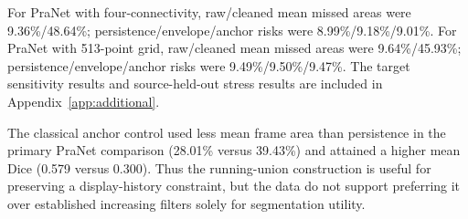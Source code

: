 For PraNet with four-connectivity, raw/cleaned mean missed areas were 9.36\%/48.64\%; persistence/envelope/anchor risks were 8.99\%/9.18\%/9.01\%. For PraNet with 513-point grid, raw/cleaned mean missed areas were 9.64\%/45.93\%; persistence/envelope/anchor risks were 9.49\%/9.50\%/9.47\%. The target sensitivity results and source-held-out stress results are included in Appendix~\ref{app:additional}.

The classical anchor control used less mean frame area than persistence in the primary PraNet comparison (28.01\% versus 39.43\%) and attained a higher mean Dice (0.579 versus 0.300). Thus the running-union construction is useful for preserving a display-history constraint, but the data do not support preferring it over established increasing filters solely for segmentation utility.
